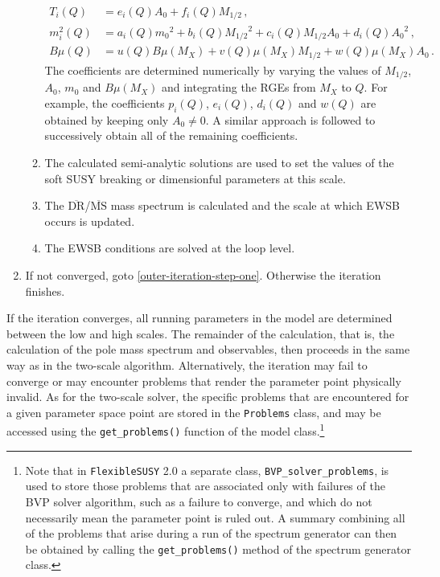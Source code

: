 \documentclass[final,3p,11pt,pdflatex]{elsarticle}
\makeatletter
\newcommand{\fs}{\texttt{FlexibleSUSY}\@\xspace}
\newcommand{\fstwo}{\fs 2.0\@\xspace}
\newcommand{\code}[1]{\lstinline|#1|}  %
\newcommand{\ol}[1]{\overline{#1}}
\newcommand{\MSbar}{\ensuremath{\ol{\text{MS}}}\xspace}
\newcommand{\DRbar}{\ensuremath{\ol{\text{DR}}}\xspace}
\newcommand{\azero}{\ensuremath{A_0}\xspace}
\newcommand{\mhalf}{\ensuremath{M_{1/2}}\xspace}
\newcommand{\mzero}{\ensuremath{m_0}\xspace}
\makeatother
\begin{document}
\begin{enumerate}
\begin{enumerate}
\begin{equation}
\begin{aligned}
        T_i(Q) &= e_i(Q) \azero + f_i(Q) \mhalf \, , \\
        m_i^2(Q) &= a_i(Q) \mzero^2 + b_i(Q) \mhalf^2
        + c_i(Q) \mhalf \azero + d_i(Q) \azero^2 \, , \\
        B\mu(Q) &= u(Q) B\mu(M_X) + v(Q) \mu(M_X) \mhalf
        + w(Q) \mu(M_X) \azero \, .
      \end{aligned} \label{eq:cmssm-semi-analytic-solns}
    \end{equation}
    The coefficients are determined numerically by varying the values of
    $\mhalf$, $\azero$, $\mzero$ and $B\mu(M_X)$ and integrating the RGEs from
    $M_X$ to $Q$.  For example, the coefficients $p_i(Q)$, $e_i(Q)$, $d_i(Q)$
    and $w(Q)$ are obtained by keeping only $\azero \neq 0$.  A similar approach
    is followed to successively obtain all of the remaining coefficients.
  \item The calculated semi-analytic solutions are used to set the values of
    the soft SUSY breaking or dimensionful parameters at this scale.
  \item The \DRbar/\MSbar mass spectrum is calculated and the scale at which
    EWSB occurs is updated.
  \item The EWSB conditions are solved at the loop level.
  \end{enumerate}
\item If not converged, goto \ref{outer-iteration-step-one}.  Otherwise
  the iteration finishes.
\end{enumerate}
%
If the iteration converges, all running parameters in the model are determined
between the low  and high scales.  The remainder of the calculation, that is,
the calculation of the pole mass spectrum and observables, then proceeds in
the same way as in the two-scale algorithm.  Alternatively, the iteration
may fail to converge or may encounter problems that render the parameter point
physically invalid.  As for the two-scale solver, the specific problems that
are encountered for a given parameter space point are stored in the
\code{Problems} class, and may be accessed using the \code{get_problems()}
function of the model class.\footnote{Note that in \fstwo a separate class,
\code{BVP_solver_problems}, is used to store those problems that are associated
only with failures of the BVP solver algorithm, such as a failure to converge,
and which do not necessarily mean the parameter point is ruled out.  A summary
combining all of the problems that arise during a run of the spectrum generator
can then be obtained by calling the \code{get_problems()} method of the spectrum
generator class.}
\end{document}
